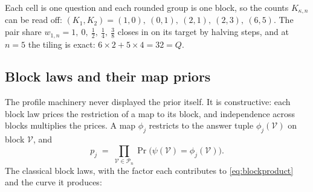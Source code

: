 \documentclass[11pt]{article}
\begin{document}
\begin{example}
\begin{center}
\end{center}

Each cell is one question and each rounded group is one block, so
the counts $K_{\kappa,n}$ can be read off:
$(K_1, K_2) = (1,0),\ (0,1),\ (2,1),\ (2,3),\ (6,5)$. The pair share
$w_{1,n} = 1,\ 0,\ \tfrac12,\ \tfrac14,\ \tfrac38$ closes in on its
target by halving steps, and at $n = 5$ the tiling is exact:
$6 \times 2 + 5 \times 4 = 32 = Q$.
\end{example}

\subsection{Block laws and their map priors}

The profile machinery never displayed the prior itself. It is
constructive: each block law prices the restriction of a map to its
block, and independence across blocks multiplies the prices. A map
$\phi_j$ restricts to the answer tuple $\phi_j(\mathcal V)$ on block
$\mathcal V$, and
%
\begin{equation}
  p_j \;=\; \prod_{\mathcal V\in\mathcal P_n}
  \Pr\big(\psi(\mathcal V) = \phi_j(\mathcal V)\big).
  \label{eq:blockproduct}
\end{equation}
%
The classical block laws, with the factor each contributes to
\eqref{eq:blockproduct} and the curve it produces:
\end{document}

